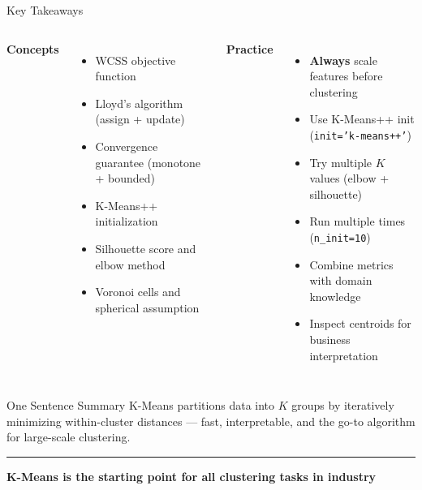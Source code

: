 \documentclass[8pt,aspectratio=169]{beamer}
\newcommand{\bottomnote}[1]{%
\vfill
\vspace{-2mm}
\textcolor{mllavender2}{\rule{\textwidth}{0.4pt}}
\vspace{1mm}
\footnotesize
\textbf{#1}
}
\newenvironment{compactlist}{%
  \begin{itemize}%
    \setlength{\itemsep}{2pt}%
    \setlength{\parskip}{0pt}%
    \setlength{\parsep}{0pt}%
}{%
  \end{itemize}%
}
\newcommand{\highlight}[1]{\textcolor{mlorange}{\textbf{#1}}}
\begin{document}
\begin{frame}[t]{Key Takeaways}
\begin{columns}[T]
\small
\textcolor{mlpurple}{\textbf{Concepts}}

\footnotesize
\begin{compactlist}
\item \footnotesize WCSS objective function
\item \footnotesize Lloyd's algorithm (assign + update)
\item \footnotesize Convergence guarantee (monotone + bounded)
\item \footnotesize K-Means++ initialization
\item \footnotesize Silhouette score and elbow method
\item \footnotesize Voronoi cells and spherical assumption
\end{compactlist}

\small
\textcolor{mlpurple}{\textbf{Practice}}

\footnotesize
\begin{compactlist}
\item \footnotesize \highlight{Always} scale features before clustering
\item \footnotesize Use K-Means++ init (\texttt{init='k-means++'})
\item \footnotesize Try multiple $K$ values (elbow + silhouette)
\item \footnotesize Run multiple times (\texttt{n\_init=10})
\item \footnotesize Combine metrics with domain knowledge
\item \footnotesize Inspect centroids for business interpretation
\end{compactlist}
\end{columns}

\vspace{3mm}
\begin{block}{One Sentence Summary}
\footnotesize K-Means partitions data into $K$ groups by iteratively minimizing within-cluster distances --- fast, interpretable, and the go-to algorithm for large-scale clustering.
\end{block}
\bottomnote{K-Means is the starting point for all clustering tasks in industry}
\end{frame}
\end{document}
